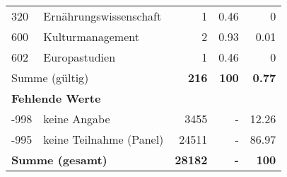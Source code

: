 \begin{longtable}{lXrrr}
        320 & \multicolumn{1}{X}{Ernährungswissenschaft} & %
          \num{1} &
          \num[round-mode=places,round-precision=2]{0.46} &
          \num[round-mode=places,round-precision=2]{0} \\

        600 & \multicolumn{1}{X}{Kulturmanagement} & %
          \num{2} &
          \num[round-mode=places,round-precision=2]{0.93} &
          \num[round-mode=places,round-precision=2]{0.01} \\

        602 & \multicolumn{1}{X}{Europastudien} & %
          \num{1} &
          \num[round-mode=places,round-precision=2]{0.46} &
          \num[round-mode=places,round-precision=2]{0} \\

     \midrule
     \multicolumn{2}{l}{Summe (gültig)} &
       \textbf{\num{216}} &
     \textbf{100} &
       \textbf{\num[round-mode=places,round-precision=2]{0.77}} \\
     \multicolumn{5}{l}{\textbf{Fehlende Werte}}\\
       -998 &
       keine Angabe &
         \num{3455} &
        - &
         \num[round-mode=places,round-precision=2]{12.26} \\
       -995 &
       keine Teilnahme (Panel) &
         \num{24511} &
        - &
         \num[round-mode=places,round-precision=2]{86.97} \\
     \midrule
     \multicolumn{2}{l}{\textbf{Summe (gesamt)}} &
          \textbf{\num{28182}} &
        \textbf{-} &
        \textbf{100} \\
     \bottomrule
     \end{longtable}
     
